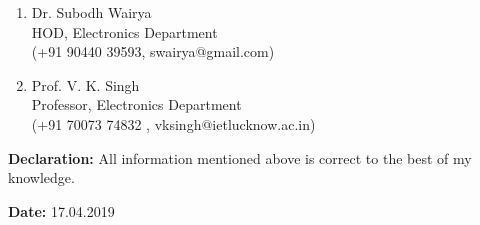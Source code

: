 \documentclass {article}
\begin{document}
	\begin {enumerate}
		\item Dr. Subodh Wairya\\ HOD, Electronics Department\\ (+91 90440 39593, swairya@gmail.com)
		\item Prof. V. K. Singh\\ Professor, Electronics Department\\(+91 70073 74832 , vksingh@ietlucknow.ac.in)
	\end {enumerate}
\begin {flushleft} \Large \textbf {Declaration:} All information mentioned above is correct to the best of my knowledge.\end{flushleft}
\begin {flushleft} \Large \textbf {Date:} 17.04.2019 \end{flushleft}
\end{document}
